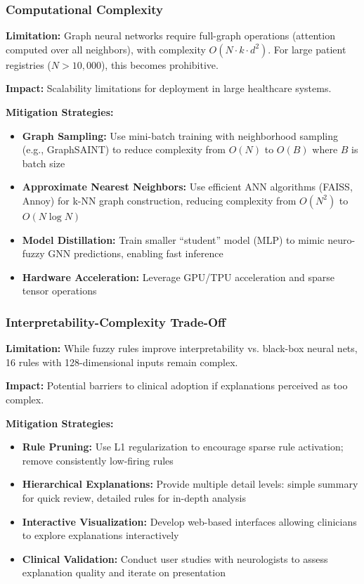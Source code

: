 \documentclass[conference]{IEEEtran}
\begin{document}
{{{\subsubsection{Computational Complexity}

\textbf{Limitation:} Graph neural networks require full-graph operations (attention computed over all neighbors), with complexity $O(N \cdot k \cdot d^2)$. For large patient registries ($N > 10,000$), this becomes prohibitive.

\textbf{Impact:} Scalability limitations for deployment in large healthcare systems.

\textbf{Mitigation Strategies:}
\begin{itemize}
\item \textbf{Graph Sampling:} Use mini-batch training with neighborhood sampling (e.g., GraphSAINT) to reduce complexity from $O(N)$ to $O(B)$ where $B$ is batch size
\item \textbf{Approximate Nearest Neighbors:} Use efficient ANN algorithms (FAISS, Annoy) for k-NN graph construction, reducing complexity from $O(N^2)$ to $O(N \log N)$
\item \textbf{Model Distillation:} Train smaller ``student'' model (MLP) to mimic neuro-fuzzy GNN predictions, enabling fast inference
\item \textbf{Hardware Acceleration:} Leverage GPU/TPU acceleration and sparse tensor operations
\end{itemize}

\subsubsection{Interpretability-Complexity Trade-Off}

\textbf{Limitation:} While fuzzy rules improve interpretability vs. black-box neural nets, 16 rules with 128-dimensional inputs remain complex.

\textbf{Impact:} Potential barriers to clinical adoption if explanations perceived as too complex.

\textbf{Mitigation Strategies:}
\begin{itemize}
\item \textbf{Rule Pruning:} Use L1 regularization to encourage sparse rule activation; remove consistently low-firing rules
\item \textbf{Hierarchical Explanations:} Provide multiple detail levels: simple summary for quick review, detailed rules for in-depth analysis
\item \textbf{Interactive Visualization:} Develop web-based interfaces allowing clinicians to explore explanations interactively
\item \textbf{Clinical Validation:} Conduct user studies with neurologists to assess explanation quality and iterate on presentation
\end{itemize}

}}}
\end{document}
